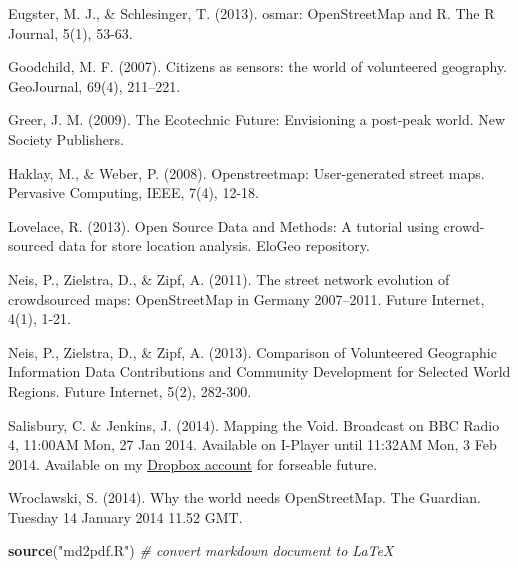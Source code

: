 \documentclass[]{article}
\newenvironment{Shaded}{}{}
\newcommand{\KeywordTok}[1]{\textcolor[rgb]{0.00,0.44,0.13}{\textbf{{#1}}}}
\newcommand{\StringTok}[1]{\textcolor[rgb]{0.25,0.44,0.63}{{#1}}}
\newcommand{\CommentTok}[1]{\textcolor[rgb]{0.38,0.63,0.69}{\textit{{#1}}}}
\newcommand{\NormalTok}[1]{{#1}}
\begin{document}
Eugster, M. J., \& Schlesinger, T. (2013). osmar: OpenStreetMap and R.
The R Journal, 5(1), 53-63.

Goodchild, M. F. (2007). Citizens as sensors: the world of volunteered
geography. GeoJournal, 69(4), 211--221.

Greer, J. M. (2009). The Ecotechnic Future: Envisioning a post-peak
world. New Society Publishers.

Haklay, M., \& Weber, P. (2008). Openstreetmap: User-generated street
maps. Pervasive Computing, IEEE, 7(4), 12-18.

Lovelace, R. (2013). Open Source Data and Methods: A tutorial using
crowd-sourced data for store location analysis. EloGeo repository.

Neis, P., Zielstra, D., \& Zipf, A. (2011). The street network evolution
of crowdsourced maps: OpenStreetMap in Germany 2007--2011. Future
Internet, 4(1), 1-21.

Neis, P., Zielstra, D., \& Zipf, A. (2013). Comparison of Volunteered
Geographic Information Data Contributions and Community Development for
Selected World Regions. Future Internet, 5(2), 282-300.

Salisbury, C. \& Jenkins, J. (2014). Mapping the Void. Broadcast on BBC
Radio 4, 11:00AM Mon, 27 Jan 2014. Available on I-Player until 11:32AM
Mon, 3 Feb 2014. Available on my
\href{https://dl.dropboxusercontent.com/u/15008199/egs2stay/Mapping_the_Void_-_Mapping_the_Void_b03s6mf0_default.m4a}{Dropbox
account} for forseable future.

Wroclawski, S. (2014). Why the world needs OpenStreetMap. The Guardian.
Tuesday 14 January 2014 11.52 GMT.

\begin{Shaded}
\begin{Highlighting}[]
\KeywordTok{source}\NormalTok{(}\StringTok{"md2pdf.R"}\NormalTok{)  }\CommentTok{# convert markdown document to LaTeX}
\end{Highlighting}
\end{Shaded}
\end{document}
